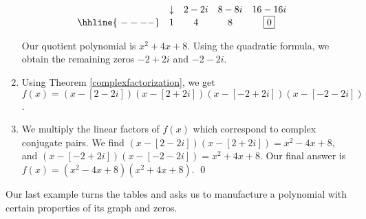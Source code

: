 \begin{ex}
\begin{enumerate}
\[\begin{array}{cccccc}
               & \downarrow &  2-2i  &  8-8i  & 16-16i &\\ \hhline{~----} 
 
                & 1  &  4  & 8& \fbox{0} &   \\
  


\end{array}\]

Our quotient polynomial is $x^2+4x+8$.  Using the quadratic formula, we obtain the remaining zeros $-2+2i$ and $-2-2i$.  

\item  Using Theorem \ref{complexfactorization}, we get $f(x) = (x-[2-2i])(x-[2+2i])(x-[-2+2i])(x-[-2-2i])$.

\item  We multiply the linear factors of $f(x)$ which correspond to complex conjugate pairs.  We find $(x-[2-2i])(x-[2+2i]) = x^2-4x+8$, and $(x-[-2+2i])(x-[-2-2i]) = x^2+4x+8$.  Our final answer is $f(x) =  \left(x^2-4x+8\right) \left(x^2+4x+8\right)$. \qed

\end{enumerate}

\end{ex}


Our last example turns the tables and asks us to manufacture a polynomial with certain properties of its graph and zeros.

